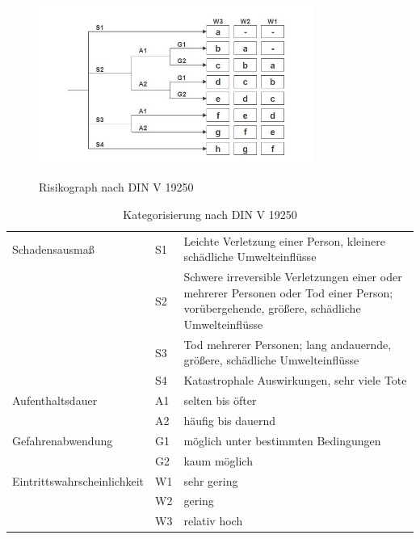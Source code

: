 \begin{savenotes}
	\begin{figure}[H]
		\centering
		\includegraphics[width=9cm,height=6cm]{figures/Risikograph}
		\caption[Risikograph nach DIN V 1925]{Risikograph nach DIN V 19250 \parencite[S. 51]{Hillenbrand.2012}}\label{fig:Risikograph}
	\end{figure}
\end{savenotes}

\begin{table}[htpb]
	\scriptsize
	\caption[Kategorisierung nach DIN V 19250]{Kategorisierung nach DIN V 19250 \parencite[S. 52]{Hillenbrand.2012}}\label{tab:Kategorisierung nach DIN V 19250}
	\centering
	\begin{tabular}{l l p{7cm}}
		\toprule
		Schadensausmaß & S1 & Leichte Verletzung einer Person, kleinere schädliche Umwelteinflüsse\\
		& S2 & Schwere irreversible Verletzungen einer oder mehrerer Personen oder Tod einer Person; vorübergehende, größere, schädliche Umwelteinflüsse\\
		& S3 & Tod mehrerer Personen; lang andauernde, größere, schädliche Umwelteinflüsse\\
		& S4 & Katastrophale Auswirkungen, sehr viele Tote\\
		\midrule
		Aufenthaltsdauer & A1 & selten bis öfter\\
		& A2 & häufig bis dauernd\\
		\midrule
		Gefahrenabwendung & G1 & möglich unter bestimmten Bedingungen\\
		& G2 & kaum möglich\\
		\midrule
		Eintrittswahrscheinlichkeit & W1 & sehr gering\\
		& W2 & gering\\
		& W3 & relativ hoch\\
		\bottomrule
	\end{tabular}
\end{table}

